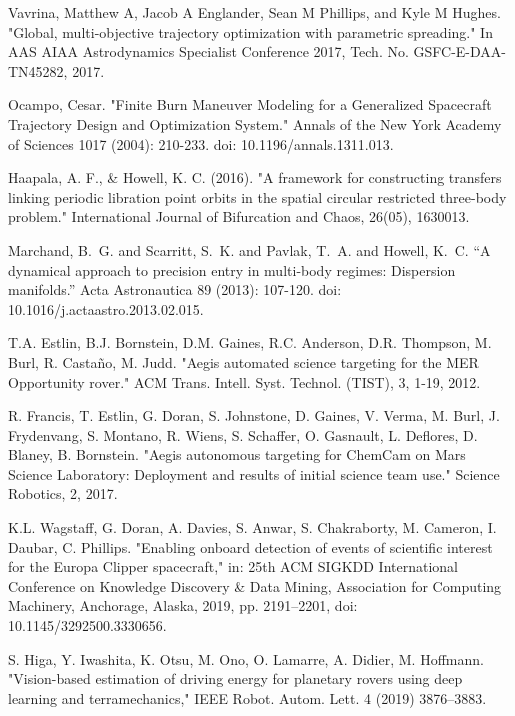 \documentclass[a4paper]{article}
\begin{document}
	\begin{thebibliography}{1}
		
		
		Vavrina, Matthew A, Jacob A Englander, Sean M Phillips, and Kyle M Hughes.
		"Global, multi-objective trajectory optimization with parametric spreading."
		In AAS AIAA Astrodynamics Specialist Conference 2017, Tech. No. GSFC-E-DAA-TN45282, 2017.	
		
		
		Ocampo, Cesar.
		"Finite Burn Maneuver Modeling for a Generalized Spacecraft Trajectory Design and Optimization System."
		Annals of the New York Academy of Sciences 1017 (2004): 210-233.
		doi: 10.1196/annals.1311.013.
		
		
		Haapala, A. F., \& Howell, K. C. (2016).
		"A framework for constructing transfers linking periodic libration point orbits in the spatial circular restricted three-body problem."
		International Journal of Bifurcation and Chaos, 26(05), 1630013.
		
		
		Marchand, B.~G. and Scarritt, S.~K. and Pavlak, T.~A. and Howell, K.~C.
		``A dynamical approach to precision entry in multi-body regimes: Dispersion manifolds.''
		Acta Astronautica 89 (2013): 107-120.
		doi: 10.1016/j.actaastro.2013.02.015.
		
		T.A. Estlin, B.J. Bornstein, D.M. Gaines, R.C. Anderson, D.R. Thompson, M. Burl, R. Castaño, M. Judd.
		"Aegis automated science targeting for the MER Opportunity rover."
		ACM Trans. Intell. Syst. Technol. (TIST), 3, 1-19, 2012.
		
		R. Francis, T. Estlin, G. Doran, S. Johnstone, D. Gaines, V. Verma, M. Burl, J. Frydenvang, S. Montano, R. Wiens, S. Schaffer, O. Gasnault, L. Deflores, D. Blaney, B. Bornstein.
		"Aegis autonomous targeting for ChemCam on Mars Science Laboratory: Deployment and results of initial science team use."
		Science Robotics, 2, 2017.
		
		K.L. Wagstaff, G. Doran, A. Davies, S. Anwar, S. Chakraborty, M. Cameron, I. Daubar, C. Phillips.
		"Enabling onboard detection of events of scientific interest for the Europa Clipper spacecraft,"
		in: 25th ACM SIGKDD International Conference on Knowledge Discovery \& Data Mining,
		Association for Computing Machinery, Anchorage, Alaska, 2019, pp. 2191--2201,
		doi: 10.1145/3292500.3330656.
		
		S. Higa, Y. Iwashita, K. Otsu, M. Ono, O. Lamarre, A. Didier, M. Hoffmann.
		"Vision-based estimation of driving energy for planetary rovers using deep learning and terramechanics,"
		IEEE Robot. Autom. Lett. 4 (2019) 3876–3883.
		

\end{thebibliography}
\end{document}
